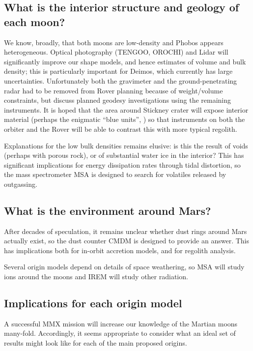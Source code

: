 \subsection{What is the interior structure and geology of each moon?}

We know, broadly, that both moons are low-density and Phobos appears heterogeneous. Optical photography (TENGOO, OROCHI) and Lidar will significantly improve our shape models, and hence estimates of volume and bulk density; this is particularly important for Deimos, which currently has large uncertainties. Unfortunately both the gravimeter and the ground-penetrating radar had to be removed from Rover planning because of weight/volume constraints, but \citet{matsumoto_mmx_2021} discuss planned geodesy investigations using the remaining instruments. It is hoped that the area around Stickney crater will expose interior material (perhaps the enigmatic ``blue units'', \citet{fraeman_spectral_2014}) so that instruments on both the orbiter and the Rover will be able to contrast this with more typical regolith.

Explanations for the low bulk densities remains elusive: is this the result of voids (perhaps with porous rock), or of substantial water ice in the interior? This has significant implications for energy dissipation rates through tidal distortion, so the mass spectrometer MSA is designed to search for volatiles released by outgassing.

\subsection{What is the environment around Mars?}
	
After decades of speculation, it remains unclear whether dust rings around Mars actually exist, so the dust counter CMDM is designed to provide an answer. This has implications both for in-orbit accretion models, and for regolith analysis. 

Several origin models depend on details of space weathering, so MSA will study ions around the moons and IREM will study other radiation.

\subsection{Implications for each origin model}

A successful MMX mission will increase our knowledge of the Martian moons many-fold. Accordingly, it seems appropriate to consider what an ideal set of results might look like for each of the main proposed origins.

